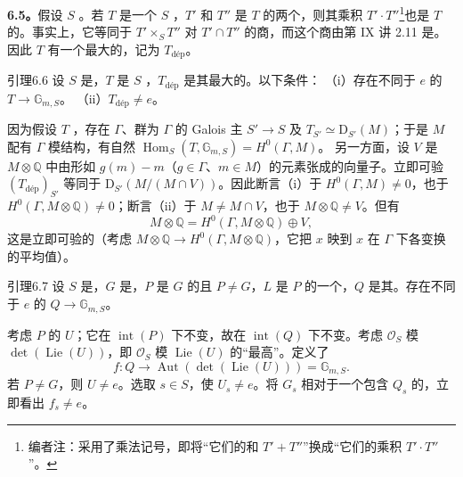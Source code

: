 \textbf{6.5。}假设 $S$ 。若 $T$ 是一个 $S$ ，$T'$ 和 $T''$ 是 $T$ 的两个，则其乘积 $T'\cdot T''$\footnote{编者注：采用了乘法记号，即将“它们的和 $T'+T''$”换成“它们的乘积 $T'\cdot T''$”。}也是 $T$ 的。事实上，它等同于 $T'\times_ST''$ 对 $T'\cap T''$ 的商，而这个商由第 IX 讲 2.11 是。因此 $T$ 有一个最大的，记为 $T_{\mathrm{d\text{é}p}}$。

\begin{SGAresult}{引理}{6.6}
设 $S$ 是，$T$ 是 $S$ ，$T_{\mathrm{d\text{é}p}}$ 是其最大的。以下条件：
（i）存在不同于 $e$ 的 $T\to\mathbb G_{m,S}$。
（ii）$T_{\mathrm{d\text{é}p}}\neq e$。
\end{SGAresult}
因为假设 $T$ ，存在 $\Gamma$、群为 $\Gamma$ 的 Galois 主 $S'\to S$ 及 $T_{S'}\simeq\mathrm D_{S'}(M)$；于是 $M$ 配有 $\Gamma$ 模结构，有自然 $\operatorname{Hom}_S(T,\mathbb G_{m,S})=H^0(\Gamma,M)$。
另一方面，设 $V$ 是 $M\otimes\mathbb Q$ 中由形如 $g(m)-m$（$g\in\Gamma$、$m\in M$）的元素张成的向量子。立即可验 $(T_{\mathrm{d\text{é}p}})_{S'}$ 等同于 $\mathrm D_{S'}(M/(M\cap V))$。因此断言（i）于 $H^0(\Gamma,M)\neq0$，也于 $H^0(\Gamma,M\otimes\mathbb Q)\neq0$；断言（ii）于 $M\neq M\cap V$，也于 $M\otimes\mathbb Q\neq V$。但有
\[
 M\otimes\mathbb Q=H^0(\Gamma,M\otimes\mathbb Q)\oplus V,
\]
这是立即可验的（考虑 $M\otimes\mathbb Q\to H^0(\Gamma,M\otimes\mathbb Q)$，它把 $x$ 映到 $x$ 在 $\Gamma$ 下各变换的平均值）。
\begin{SGAresult}{引理}{6.7}
设 $S$ 是，$G$ 是，$P$ 是 $G$ 的且 $P\neq G$，$L$ 是 $P$ 的一个，$Q$ 是其。存在不同于 $e$ 的 $Q\to\mathbb G_{m,S}$。
\end{SGAresult}
考虑 $P$ 的 $U$；它在 $\operatorname{int}(P)$ 下不变，故在 $\operatorname{int}(Q)$ 下不变。考虑 $\mathscr O_S$ 模 $\det(\operatorname{Lie}(U))$，即 $\mathscr O_S$ 模 $\operatorname{Lie}(U)$ 的“最高”。定义了
\[
 f:Q\longrightarrow\operatorname{Aut}(\det(\operatorname{Lie}(U)))=\mathbb G_{m,S}.
\]
若 $P\neq G$，则 $U\neq e$。选取 $s\in S$，使 $U_s\neq e$。将 $G_s$ 相对于一个包含 $Q_s$ 的，立即看出 $f_s\neq e$。

